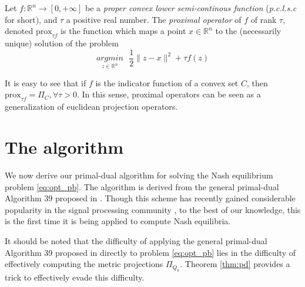 \documentclass{article} %
\begin{document}
Let $f : \mathbb{R}^n \rightarrow [0, +\infty]$ be a \textit{proper convex lower semi-continous function} (\textit{p.c.l.s.c} for short), and $\tau$ a positive real number. The \textit{proximal operator} of $f$ of rank $\tau$,
denoted $\text{prox}_{\tau f}$ is the function which maps a point $x \in \mathbb{R}^n$ to the (necessarily unique) solution of the problem
\begin{equation}
  \underset{z \in \mathbb{R}^n}{argmin}\text{ }\frac{1}{2}\|z - x\|^2 + \tau f(z)
\end{equation}

It is easy to see that if $f$ is the indicator function of a convex set $C$, then $\text{prox}_{\tau f} = \Pi_C, \forall \tau > 0$. In this sense, proximal operators can be seen
as a generalization of euclidean projection operators.

\section{The algorithm}
\label{sec:algo}
We now derive our primal-dual algorithm for solving the Nash equilibrium problem \eqref{eq:opt_pb}. The algorithm is derived from the general primal-dual Algorithm 39 proposed in \cite{chambolle2010}. Though this scheme has recently gained considerable popularity in the signal processing community
, to the best of our knowledge, this is the first time it is being applied to compute Nash equilibria.

It should be noted that the difficulty of applying the general primal-dual Algorithm 39 proposed in \cite{chambolle2010} directly to problem \eqref{eq:opt_pb} lies in the difficulty of effectively computing the metric projections $\Pi_{Q_k}$. Theorem \ref{thm:pd} provides a trick to effectively evade this difficulty.
\end{document}
